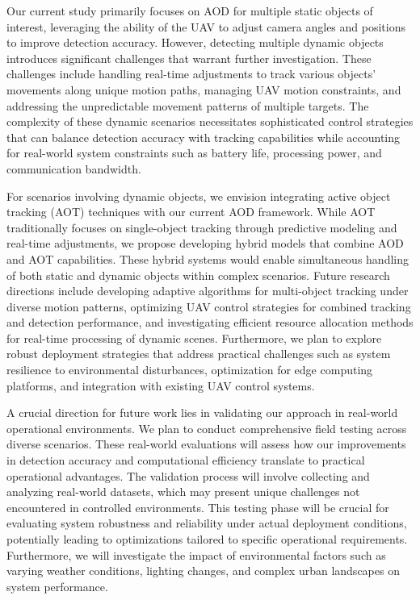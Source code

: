 \documentclass[lettersize,journal]{IEEEtran}
\begin{document}
Our current study primarily focuses on AOD for multiple static objects of interest, leveraging the ability of the UAV to adjust camera angles and positions to improve detection accuracy. However, detecting multiple dynamic objects introduces significant challenges that warrant further investigation. These challenges include handling real-time adjustments to track various objects' movements along unique motion paths, managing UAV motion constraints, and addressing the unpredictable movement patterns of multiple targets. The complexity of these dynamic scenarios necessitates sophisticated control strategies that can balance detection accuracy with tracking capabilities while accounting for real-world system constraints such as battery life, processing power, and communication bandwidth.

For scenarios involving dynamic objects, we envision integrating active object tracking (AOT) techniques with our current AOD framework. While AOT traditionally focuses on single-object tracking through predictive modeling and real-time adjustments, we propose developing hybrid models that combine AOD and AOT capabilities. These hybrid systems would enable simultaneous handling of both static and dynamic objects within complex scenarios. Future research directions include developing adaptive algorithms for multi-object tracking under diverse motion patterns, optimizing UAV control strategies for combined tracking and detection performance, and investigating efficient resource allocation methods for real-time processing of dynamic scenes. Furthermore, we plan to explore robust deployment strategies that address practical challenges such as system resilience to environmental disturbances, optimization for edge computing platforms, and integration with existing UAV control systems.

A crucial direction for future work lies in validating our approach in real-world operational environments. We plan to conduct comprehensive field testing across diverse scenarios. These real-world evaluations will assess how our improvements in detection accuracy and computational efficiency translate to practical operational advantages. The validation process will involve collecting and analyzing real-world datasets, which may present unique challenges not encountered in controlled environments. This testing phase will be crucial for evaluating system robustness and reliability under actual deployment conditions, potentially leading to optimizations tailored to specific operational requirements. Furthermore, we will investigate the impact of environmental factors such as varying weather conditions, lighting changes, and complex urban landscapes on system performance.
\end{document}
